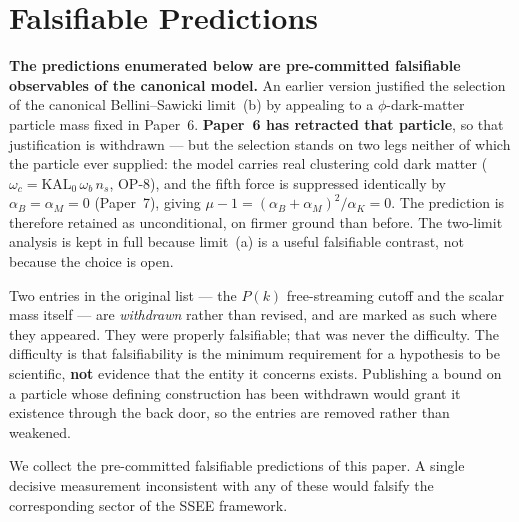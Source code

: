 \documentclass[12pt,a4paper]{article}
\begin{document}
\section{Falsifiable Predictions}
\label{sec:falsify}

\begin{tcolorbox}[colback=green!4,colframe=green!50!black,title=Scope of falsifiability --- revised 2026-08]
\textbf{The predictions enumerated below are pre-committed falsifiable
observables of the canonical model.} An earlier version justified the selection
of the canonical Bellini--Sawicki limit~(b) by appealing to a $\phi$-dark-matter
particle mass fixed in Paper~6. \textbf{Paper~6 has retracted that particle},
so that justification is withdrawn --- but the selection stands on two legs
neither of which the particle ever supplied: the model carries real clustering
cold dark matter ($\omega_c=\mathrm{KAL}_0\,\omega_b\,n_s$, OP-8), and the
fifth force is suppressed identically by $\alpha_B=\alpha_M=0$ (Paper~7), giving
$\mu-1=(\alpha_B+\alpha_M)^2/\alpha_K=0$. The prediction is therefore retained
as unconditional, on firmer ground than before. The two-limit analysis is kept
in full because limit~(a) is a useful falsifiable contrast, not because the
choice is open.

Two entries in the original list --- the $P(k)$ free-streaming cutoff and the
scalar mass itself --- are \emph{withdrawn} rather than revised, and are
marked as such where they appeared. They were properly falsifiable; that was
never the difficulty. The difficulty is that falsifiability is the minimum
requirement for a hypothesis to be scientific, \textbf{not} evidence that the
entity it concerns exists. Publishing a bound on a particle whose defining
construction has been withdrawn would grant it existence through the back
door, so the entries are removed rather than weakened.
\end{tcolorbox}


We collect the pre-committed falsifiable predictions of this paper.
A single decisive measurement inconsistent with any of these would
falsify the corresponding sector of the SSEE framework.
\end{document}
